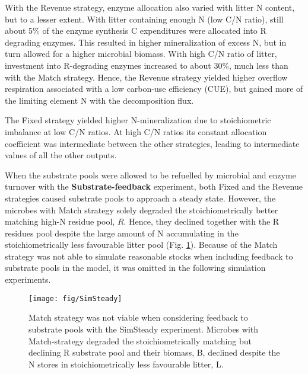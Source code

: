 With the Revenue strategy, enzyme allocation also varied with litter N content,
but to a lesser extent.
With litter containing enough N (low C/N ratio), still about 5\% of the enzyme
synthesis C expenditures were allocated into R degrading enzymes. This resulted
in higher mineralization of excess N, but in turn allowed for a higher microbial
biomass.
With high C/N ratio of litter, investment into R-degrading enzymes increased to
about 30\%, much less than with the Match strategy. Hence, the Revenue strategy
yielded higher overflow respiration associated with a low carbon-use
efficiency (CUE), but gained more of the limiting element N with the
decomposition flux.

The Fixed strategy yielded higher N-mineralization due to stoichiometric
imbalance at low C/N ratios.
At high C/N ratios its constant allocation coefficient was intermediate between
the other strategies, leading to intermediate values of all the other outputs.


When the substrate pools were allowed to be refuelled by microbial and enzyme
turnover with the \textbf{Substrate-feedback} experiment, both Fixed and the Revenue
strategies caused substrate pools to approach a steady state.
However, the microbes with Match strategy solely degraded the stoichiometrically
better matching high-N residue pool, $R$. Hence, they declined together with the
R residues pool despite the large amount of N accumulating in the
stoichiometrically less favourable litter pool (Fig. \ref{fig:SimSteady}).
Because of the Match strategy was not able to simulate reasonable stocks when
including feedback to substrate pools in the model, it was omitted in the
following simulation experiments.

\begin{figure}[t]
\vspace*{2mm}
\begin{center} 
\texttt{[image: fig/SimSteady]} 
\end{center}
\caption{
Match strategy was not viable when considering feedback to
substrate pools with the SimSteady experiment. Microbes with
Match-strategy degraded the stoichiometrically matching but declining R
substrate pool and their biomass, B, declined despite the N stores
in stoichiometrically less favourable litter, L.
\label{fig:SimSteady}} 
\end{figure}

